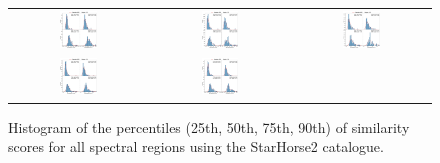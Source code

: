\documentclass{aa}
\begin{document}
\begin{appendix}
\begin{figure}[htbp]
    \centering
    \begin{tabular}{ccc}
        \includegraphics[width=0.29\textwidth]{Plots/simil_thresh_hists/simil_thresh_histograms_R2_starhorse2.pdf}& \includegraphics[width=0.29\textwidth]{Plots/simil_thresh_hists/simil_thresh_histograms_R3_starhorse2.pdf}& \includegraphics[width=0.29\textwidth]{Plots/simil_thresh_hists/simil_thresh_histograms_R4_starhorse2.pdf}\\ \includegraphics[width=0.29\textwidth]{Plots/simil_thresh_hists/simil_thresh_histograms_R5_starhorse2.pdf}& \includegraphics[width=0.29\textwidth]{Plots/simil_thresh_hists/simil_thresh_histograms_R6_starhorse2.pdf} & 
        \\
    \end{tabular}
    \caption{Histogram of the percentiles (25th, 50th, 75th, 90th) of similarity scores for all spectral regions using the StarHorse2 catalogue.}
\end{figure}


\end{appendix}
\end{document}
